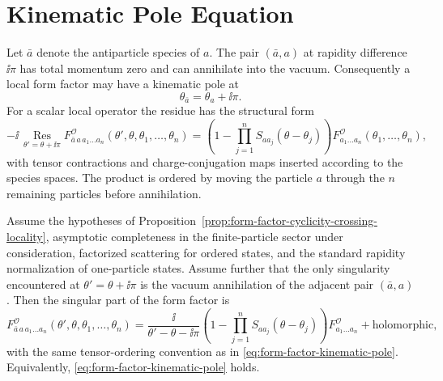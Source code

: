 \section{Kinematic Pole Equation}

Let \(\bar a\) denote the antiparticle species of \(a\).  The pair
\((\bar a,a)\) at rapidity difference \(\ii\pi\) has total momentum zero and
can annihilate into the vacuum.  Consequently a local form factor may have a
kinematic pole at
\[
  \theta_{\bar a}=\theta_a+\ii\pi .
\]
For a scalar local operator the residue has the structural form
\begin{equation}
  -\ii\,\operatorname*{Res}_{\theta'=\theta+\ii\pi}
  F^{\mathcal O}_{\bar a\,a\,a_1\ldots a_n}
  (\theta',\theta,\theta_1,\ldots,\theta_n)
  =
  \left(
    1-\prod_{j=1}^n
    S_{a a_j}(\theta-\theta_j)
  \right)
  F^{\mathcal O}_{a_1\ldots a_n}(\theta_1,\ldots,\theta_n),
\label{eq:form-factor-kinematic-pole}
\end{equation}
with tensor contractions and charge-conjugation maps inserted according to
the species spaces.  The product is ordered by moving the particle \(a\)
through the \(n\) remaining particles before annihilation.

\begin{proposition}
\label{prop:form-factor-kinematic-pole-derived}
Assume the hypotheses of
Proposition~\ref{prop:form-factor-cyclicity-crossing-locality}, asymptotic
completeness in the finite-particle sector under consideration, factorized
scattering for ordered states, and the standard rapidity normalization of
one-particle states.  Assume further that the only singularity encountered at
\(\theta'=\theta+\ii\pi\) is the vacuum annihilation of the adjacent pair
\((\bar a,a)\).  Then the singular part of the form factor is
\[
  F^{\mathcal O}_{\bar a\,a\,a_1\ldots a_n}
  (\theta',\theta,\theta_1,\ldots,\theta_n)
  =
  \frac{\ii}{\theta'-\theta-\ii\pi}
  \left(
    1-\prod_{j=1}^nS_{a a_j}(\theta-\theta_j)
  \right)
  F^{\mathcal O}_{a_1\ldots a_n}
  +\text{holomorphic},
\]
with the same tensor-ordering convention as in
\eqref{eq:form-factor-kinematic-pole}.  Equivalently,
\eqref{eq:form-factor-kinematic-pole} holds.
\end{proposition}

